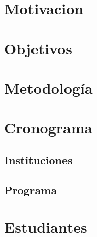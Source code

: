 \documentclass[12pts]{article}
\begin{document}
\section{Motivacion}

\section{Objetivos}

\section{Metodolog\'ia}

\section{Cronograma}

\subsection{Instituciones}

\subsection{Programa}

\section{Estudiantes}
\end{document}
